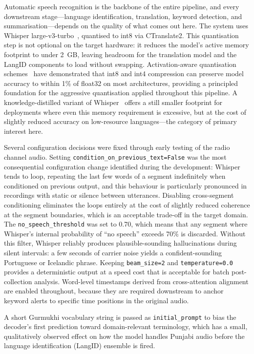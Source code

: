 \documentclass[12pt, onecolumn]{IEEEtran}
\begin{document}
Automatic speech recognition is the backbone of the entire pipeline, and every downstream stage---language identification, translation, keyword detection, and summarisation---depends on the quality of what comes out here. The system uses Whisper large-v3-turbo~\cite{radford2022whisper}, quantised to int8 via CTranslate2. This quantisation step is not optional on the target hardware: it reduces the model's active memory footprint to under 2~GB, leaving headroom for the translation model and the LangID components to load without swapping. Activation-aware quantisation schemes~\cite{lin2024awq} have demonstrated that int8 and int4 compression can preserve model accuracy to within 1\% of float32 on most architectures, providing a principled foundation for the aggressive quantisation applied throughout this pipeline. A knowledge-distilled variant of Whisper~\cite{gandhi2023distilwhisper} offers a still smaller footprint for deployments where even this memory requirement is excessive, but at the cost of slightly reduced accuracy on low-resource languages---the category of primary interest here.

Several configuration decisions were fixed through early testing of the radio channel audio. Setting \texttt{condition\_on\_previous\_text=False} was the most consequential configuration change identified during the development: Whisper tends to loop, repeating the last few words of a segment indefinitely when conditioned on previous output, and this behaviour is particularly pronounced in recordings with static or silence between utterances. Disabling cross-segment conditioning eliminates the loops entirely at the cost of slightly reduced coherence at the segment boundaries, which is an acceptable trade-off in the target domain. The \texttt{no\_speech\_threshold} was set to 0.70, which means that any segment where Whisper's internal probability of ``no speech'' exceeds 70\% is discarded. Without this filter, Whisper reliably produces plausible-sounding hallucinations during silent intervals: a few seconds of carrier noise yields a confident-sounding Portuguese or Icelandic phrase. Keeping \texttt{beam\_size=2} and \texttt{temperature=0.0} provides a deterministic output at a speed cost that is acceptable for batch post-collection analysis. Word-level timestamps derived from cross-attention alignment are enabled throughout, because they are required downstream to anchor keyword alerts to specific time positions in the original audio.

A short Gurmukhi vocabulary string is passed as \texttt{initial\_prompt} to bias the decoder's first prediction toward domain-relevant terminology, which has a small, qualitatively observed effect on how the model handles Punjabi audio before the language identification (LangID) ensemble is fired.
\end{document}
